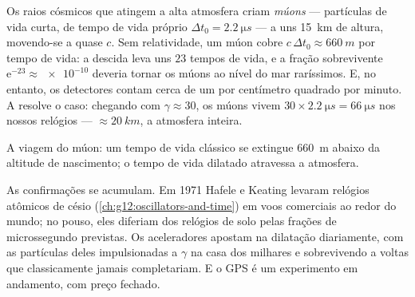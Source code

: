 \begin{example}\label{ex:g12:special-relativity:muons}
Os raios cósmicos que atingem a alta atmosfera criam \emph{múons} --- partículas de vida
curta, de tempo de vida próprio $\Delta t_0 = \qty{2.2}{\micro s}$ --- a uns
\qty{15}{km} de altura, movendo-se a quase $c$. Sem relatividade, um múon cobre
$c\,\Delta t_0 \approx \qty{660}{m}$ por tempo de vida: a descida leva uns $23$ tempos de
vida, e a fração sobrevivente $\mathrm{e}^{-23} \approx \num{e-10}$ deveria tornar os
múons ao nível do mar raríssimos. E, no entanto, os detectores contam cerca de um por
centímetro quadrado por minuto. A  resolve o caso: chegando com
$\gamma \approx 30$, os múons vivem $30 \times \qty{2.2}{\micro s} = \qty{66}{\micro s}$
nos nossos relógios ---  $\approx \qty{20}{km}$, a atmosfera inteira.
\end{example}

\begin{omfigure}

{\small A viagem do múon: um tempo de vida clássico se extingue \qty{660}{m} abaixo da
altitude de nascimento; o tempo de vida dilatado atravessa a atmosfera.}
\end{omfigure}

As confirmações se acumulam. Em 1971 Hafele e Keating levaram relógios atômicos de césio
(\cref{ch:g12:oscillators-and-time}) em voos comerciais ao redor do mundo; no pouso, eles
diferiam dos relógios de solo pelas frações de microssegundo previstas. Os aceleradores
apostam na dilatação diariamente, com as partículas deles impulsionadas a $\gamma$ na
casa dos milhares e sobrevivendo a voltas que classicamente jamais completariam. E o GPS
é um experimento em andamento, com preço fechado.

